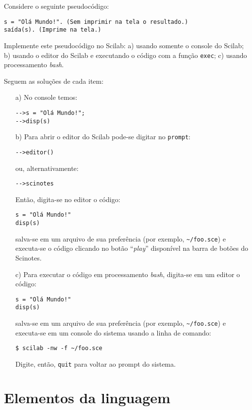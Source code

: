 \begin{ex}
  Considere o seguinte pseudocódigo:
\begin{verbatim}
s = "Olá Mundo!". (Sem imprimir na tela o resultado.)
saída(s). (Imprime na tela.)
\end{verbatim}
Implemente este pseudocódigo no Scilab: a) usando somente o console do Scilab; b) usando o editor do Scilab e executando o código com a função \verb+exec+; c) usando processamento {\it bash}.
\end{ex}
\begin{sol} Seguem as soluções de cada item:
  \begin{itemize}
  \item[a)]  No console temos:
\begin{verbatim}
-->s = "Olá Mundo!";
-->disp(s)
\end{verbatim}
  \item[b)] Para abrir o editor do Scilab pode-se digitar no \verb+prompt+:
\begin{verbatim}
-->editor()
\end{verbatim}
ou, alternativamente:
\begin{verbatim}
-->scinotes
\end{verbatim}
Então, digita-se no editor o código:
\begin{verbatim}
s = "Olá Mundo!"
disp(s)
\end{verbatim}
salva-se em um arquivo de sua preferência (por exemplo, \verb+~/foo.sce+) e executa-se o código clicando no botão ``{\it play}'' disponível na barra de botões do Scinotes.
\item[c)] Para executar o código em processamento {\it bash}, digita-se em um editor o código:
\begin{verbatim}
s = "Olá Mundo!"
disp(s)
\end{verbatim}
salva-se em um arquivo de sua preferência (por exemplo, \verb+~/foo.sce+) e executa-se em um console do sistema usando a linha de comando:
\begin{verbatim}
$ scilab -nw -f ~/foo.sce
\end{verbatim}
Digite, então, \verb+quit+ para voltar ao prompt do sistema.
\end{itemize}
\end{sol}

\section{Elementos da linguagem}

